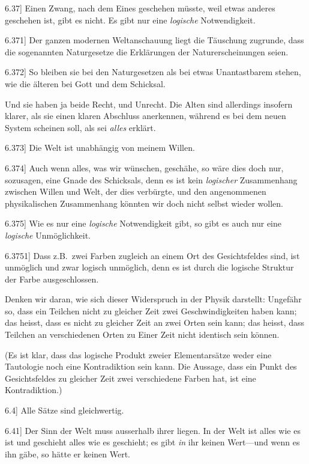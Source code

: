 \documentclass[12pt,oneside]{book}[2007/10/19]
\newcommand{\PropERef}[1]{\hyperref[PropE:#1]{#1}}
\newcommand{\PropositionG}[2]{%
  \item[\phantomsection\label{PropG:#1}\PropERef{#1}] #2%
}
\newcommand{\Emph}[1]{\emph{#1}}%
\newcommand{\zumBeispiel}{z.\;B.}
\begin{document}
\begin{propositions}
\PropositionG{6.37}
{Einen Zwang, nach dem Eines geschehen müsste,
weil etwas anderes geschehen ist, gibt es nicht. Es
gibt nur eine \Emph{logische} Notwendigkeit.}


\PropositionG{6.371}
{Der ganzen modernen Weltanschauung liegt die
Täuschung zugrunde, dass die sogenannten Naturgesetze
die Erklärungen der Naturerscheinungen
seien.}


\PropositionG{6.372}
{So bleiben sie bei den Naturgesetzen als bei
etwas Unantastbarem stehen, wie die älteren bei
Gott und dem Schicksal.

Und sie haben ja beide Recht, und Unrecht. Die
Alten sind allerdings insofern klarer, als sie einen
klaren Abschluss anerkennen, während es bei dem
neuen System scheinen soll, als sei \Emph{alles} erklärt.}


\PropositionG{6.373}
{Die Welt ist unabhängig von meinem Willen.}


\PropositionG{6.374}
{Auch wenn alles, was wir wünschen, geschähe,
so wäre dies doch nur, sozusagen, eine Gnade des
Schicksals, denn es ist kein \Emph{logischer} Zusammenhang
zwischen Willen und Welt, der dies
verbürgte, und den angenommenen physikalischen
Zusammenhang könnten wir doch nicht selbst
wieder wollen.}


\PropositionG{6.375}
{Wie es nur eine \Emph{logische} Notwendigkeit gibt,
so gibt es auch nur eine \Emph{logische} Unmöglichkeit.}


\PropositionG{6.3751}
{Dass \zumBeispiel\ zwei Farben zugleich an einem Ort
des Gesichtsfeldes sind, ist unmöglich und zwar
logisch unmöglich, denn es ist durch die logische
Struktur der Farbe ausgeschlossen.

Denken wir daran, wie sich dieser Widerspruch
in der Physik darstellt: Ungefähr so, dass ein
Teilchen nicht zu gleicher Zeit zwei Geschwindigkeiten
haben kann; das heisst, dass es nicht zu
gleicher Zeit an zwei Orten sein kann; das heisst,
dass Teilchen an verschiedenen Orten zu Einer Zeit
nicht identisch sein können.

(Es ist klar, dass das logische Produkt zweier
Elementarsätze weder eine Tautologie noch eine
Kontradiktion sein kann. Die Aussage, dass ein
Punkt des Gesichtsfeldes zu gleicher Zeit zwei
verschiedene Farben hat, ist eine Kontradiktion.)}


\PropositionG{6.4}
{Alle Sätze sind gleichwertig.}


\PropositionG{6.41}
{Der Sinn der Welt muss ausserhalb ihrer liegen.
In der Welt ist alles wie es ist und geschieht alles
wie es geschieht; es gibt \Emph{in} ihr keinen Wert---und
wenn es ihn gäbe, so hätte er keinen Wert.

}
\end{propositions}
\end{document}
